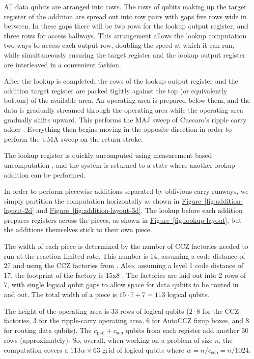 \documentclass[superscriptaddress,notitlepage,longbibliography]{revtex4-1}
\theoremstyle{definition}
\theoremstyle{definition}
\newcommand{\fig}[1]{\hyperref[fig:#1]{Figure~\ref*{fig:#1}}}
\newcommand{\gsep}{{c_{\text{sep}}}}
\newcommand{\gpad}{{c_{\text{pad}}}}
\begin{document}
All data qubits are arranged into rows.
The rows of qubits making up the target register of the addition are spread out into row pairs with gaps five rows wide in between.
In these gaps there will be two rows for the lookup output register, and three rows for access hallways.
This arrangement allows the lookup computation two ways to access each output row, doubling the speed at which it can run, while simultaneously ensuring the target register and the lookup output register are interleaved in a convenient fashion.

After the lookup is completed, the rows of the lookup output register and the addition target register are packed tightly against the top (or equivalently bottom) of the available area.
An operating area is prepared below them, and the data is gradually streamed through the operating area while the operating area gradually shifts upward.
This performs the MAJ sweep of Cuccaro's ripple carry adder \cite{cuccaro2004adder}.
Everything then begins moving in the opposite direction in order to perform the UMA sweep on the return stroke.

The lookup register is quickly uncomputed using measurement based uncomputation \cite{berry2019qubitization}, and the system is returned to a state where another lookup addition can be performed.

In order to perform piecewise additions separated by oblivious carry runways, we simply partition the computation horizontally as shown in \fig{addition-layout-2d} and \fig{addition-layout-3d}.
The lookup before each addition prepares registers across the pieces, as shown in \fig{lookup-layout}, but the additions themselves stick to their own piece.

The width of each piece is determined by the number of CCZ factories needed to run at the reaction limited rate.
This number is 14, assuming a code distance of 27 and using the CCZ factories from \cite{gidney2019autoccz, gidney2018magic}.
Also, assuming a level 1 code distance of 17, the footprint of the factory is 15x8 \cite{gidney2019autoccz}.
The factories are laid out into 2 rows of 7, with single logical qubit gaps to allow space for data qubits to be routed in and out.
The total width of a piece is $15\cdot 7 + 7 = 113$ logical qubits.

The height of the operating area is 33 rows of logical qubits ($2 \cdot 8$ for the CCZ factories, 3 for the ripple-carry operating area, 6 for AutoCCZ fixup boxes, and 8 for routing data qubits).
The $\gpad + \gsep$ qubits from each register add another 30 rows (approximately).
So, overall, when working on a problem of size $n$, the computation covers a $113w \times 63$ grid of logical qubits where $w=n/\gsep=n/1024$.
\end{document}
